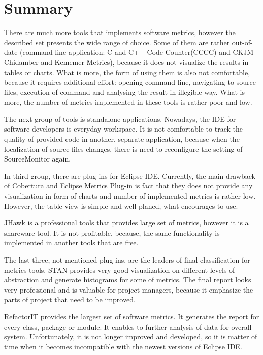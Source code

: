 \section{Summary}

There are much more tools that implements software metrics, however the described set presents the wide range of choice. Some of them are rather out-of-date (command line application: C and C++ Code Counter(CCCC) and CKJM - Chidamber and Kememer Metrics), because it does not visualize the results in tables or charts. What is more, the form of using them is also not comfortable, because it requires additional effort: opening command line, navigating to source files, execution of command and analysing the result in illegible way. What is more, the number of metrics implemented in these tools is rather poor and low.  

The next group of tools is standalone applications. Nowadays, the \ac{IDE} for software developers is everyday workspace. It is not comfortable to track the quality of provided code in another, separate application, because when the localization of source files changes, there is need to reconfigure the setting of SourceMonitor again. 

In third group, there are plug-ins for Eclipse \ac{IDE}. Currently, the main drawback of Cobertura and Eclipse Metrics Plug-in is fact that they does not provide any visualization in form of charts and number of implemented metrics is rather low. However, the table view is simple and well-planed, what encourages to use.

JHawk is a professional tools that provides large set of metrics, however it is a shareware tool. It is not profitable, because, the same functionality is implemented in another tools that are free.      

The last three, not mentioned plug-ins, are the leaders of final classification for metrics tools. STAN provides very good visualization on different levels of abstraction and generate histograms for some of metrics. The final report looks very professional and is valuable for project managers, because it emphasize the parts of project that need to be improved.

RefactorIT provides the largest set of software metrics. It generates the report for every class, package or module. It enables to further analysis of data for overall system. Unfortunately, it is not longer improved and developed, so it is matter of time when it becomes incompatible with the newest versions of Eclipse \ac{IDE}. 

